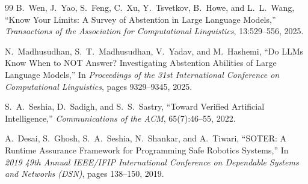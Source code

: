 \documentclass[11pt]{article}
\begin{document}
\begin{thebibliography}{99}
B.~Wen, J.~Yao, S.~Feng, C.~Xu, Y.~Tsvetkov, B.~Howe, and L.~L.~Wang,
\newblock ``Know Your Limits: A Survey of Abstention in Large Language Models,''
\newblock \emph{Transactions of the Association for Computational Linguistics}, 13:529--556, 2025.

N.~Madhusudhan, S.~T.~Madhusudhan, V.~Yadav, and M.~Hashemi,
\newblock ``Do LLMs Know When to NOT Answer? Investigating Abstention Abilities of Large Language Models,''
\newblock In \emph{Proceedings of the 31st International Conference on Computational Linguistics}, pages 9329--9345, 2025.

S.~A.~Seshia, D.~Sadigh, and S.~S.~Sastry,
\newblock ``Toward Verified Artificial Intelligence,''
\newblock \emph{Communications of the ACM}, 65(7):46--55, 2022.

A.~Desai, S.~Ghosh, S.~A.~Seshia, N.~Shankar, and A.~Tiwari,
\newblock ``SOTER: A Runtime Assurance Framework for Programming Safe Robotics Systems,''
\newblock In \emph{2019 49th Annual IEEE/IFIP International Conference on Dependable Systems and Networks (DSN)}, pages 138--150, 2019.

\end{thebibliography}
\end{document}
